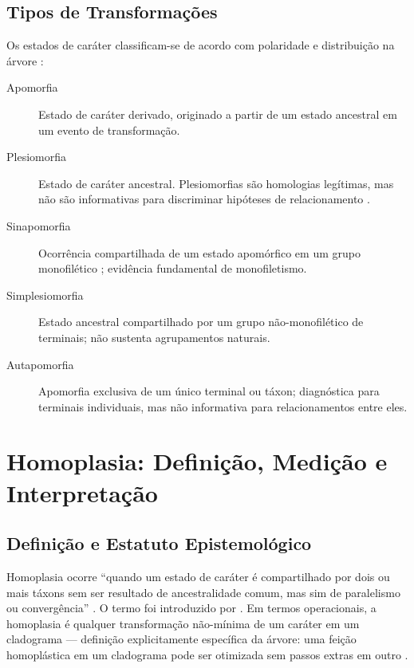 \subsection{Tipos de Transformações}

Os estados de caráter classificam-se de acordo com polaridade e distribuição na árvore \parencite{hennig1966,schuh2009}:

\begin{description}
    \item[Apomorfia] Estado de caráter derivado, originado a partir de um estado ancestral em um evento de transformação.
    \item[Plesiomorfia] Estado de caráter ancestral. Plesiomorfias são homologias legítimas, mas não são informativas para discriminar hipóteses de relacionamento \parencite{nixon2012}.
    \item[Sinapomorfia] Ocorrência compartilhada de um estado apomórfico em um grupo monofilético \parencite{grant2004a}; evidência fundamental de monofiletismo.
    \item[Simplesiomorfia] Estado ancestral compartilhado por um grupo não-monofilético de terminais; não sustenta agrupamentos naturais.
    \item[Autapomorfia] Apomorfia exclusiva de um único terminal ou táxon; diagnóstica para terminais individuais, mas não informativa para relacionamentos entre eles.
\end{description}

\section{Homoplasia: Definição, Medição e Interpretação}
\label{sec:homoplasia}

\subsection{Definição e Estatuto Epistemológico}

Homoplasia ocorre ``quando um estado de caráter é compartilhado por dois ou mais táxons sem ser resultado de ancestralidade comum, mas sim de paralelismo ou convergência'' \parencite[p.~336]{wheeleretal2006}. O termo foi introduzido por \textcite{lankester1870}. Em termos operacionais, a homoplasia é qualquer transformação não-mínima de um caráter em um cladograma --- definição explicitamente específica da árvore: uma feição homoplástica em um cladograma pode ser otimizada sem passos extras em outro \parencite{wheeler2012}.

